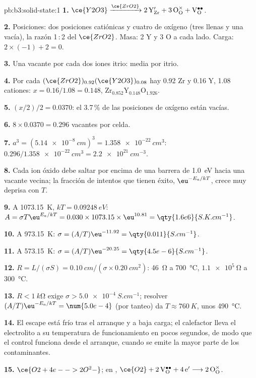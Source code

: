 \begin{solution}{pb:b3:solid-state:1}
\textbf{1.} $\ce{Y2O3} \xrightarrow{\ce{ZrO2}} \mathrm{2\,Y_{Zr}' + 3\,O_O^{\times} + V_O^{\bullet\bullet}}$.

\textbf{2.} Posiciones: dos posiciones catiónicas y cuatro de oxígeno (tres llenas y una vacía),
la razón 1\,:\,2 del $\ce{ZrO2}$. Masa: 2 Y y 3 O a cada lado. Carga: $2 \times (-1) + 2 = 0$.

\textbf{3.} Una vacante por cada dos iones itrio: media por itrio.

\textbf{4.} Por cada $(\ce{ZrO2})_{0.92}(\ce{Y2O3})_{0.08}$ hay 0.92 Zr y 0.16 Y, 1.08 cationes: $x = 0.16/1.08 = 0.148$,
$\mathrm{Zr_{0.852}Y_{0.148}O_{1.926}}$.

\textbf{5.} $(x/2)/2 = 0.0370$: el 3.7\,\% de las posiciones de oxígeno están vacías.

\textbf{6.} $8 \times 0.0370 = 0.296$ vacantes por celda.

\textbf{7.} $a^3 = (\qty{5.14e-8}{cm})^3 = \qty{1.358e-22}{cm^3}$: $0.296/\qty{1.358e-22}{cm^3} = \qty{2.2e21}{cm^{-3}}$.

\textbf{8.} Cada ion óxido debe saltar por encima de una barrera de \qty{1.0}{eV} hacia una vacante
vecina; la fracción de intentos que tienen éxito, $\eu^{-E_a/kT}$, crece muy deprisa con $T$.

\textbf{9.} A \qty{1073.15}{K}, $kT = \qty{0.09248}{eV}$: $A = \sigma T\eu^{E_a/kT} = 0.030 \times 1073.15 \times \eu^{10.81} = \qty{1.6e6}{S.K.cm^{-1}}$.

\textbf{10.} A \qty{973.15}{K}: $\sigma = (A/T)\eu^{-11.92} = \qty{0.011}{S.cm^{-1}}$.

\textbf{11.} A \qty{573.15}{K}: $\sigma = (A/T)\eu^{-20.25} = \qty{4.5e-6}{S.cm^{-1}}$.

\textbf{12.} $R = L/(\sigma S) = \qty{0.10}{cm}/(\sigma \times \qty{0.20}{cm^2})$: \qty{46}{\ohm} a \qty{700}{\celsius}, $\qty{1.1e5}{\ohm}$ a \qty{300}{\celsius}.

\textbf{13.} $R < \qty{1}{k\ohm}$ exige $\sigma > \qty{5.0e-4}{S.cm^{-1}}$; resolver $(A/T)\eu^{-E_a/kT} = \num{5.0e-4}$ (por tanteo)
da $T \approx \qty{760}{K}$, unos \qty{490}{\celsius}.

\textbf{14.} El escape está frío tras el arranque y a baja carga; el calefactor lleva el
electrolito a su temperatura de funcionamiento en pocos segundos, de modo que el control
funciona desde el arranque, cuando se emite la mayor parte de los contaminantes.

\textbf{15.} $\ce{O2 + 4e- -> 2O^2-}$; en , $\ce{O2} + \mathrm{2\,V_O^{\bullet\bullet} + 4\,e'} \longrightarrow \mathrm{2\,O_O^{\times}}$.


\end{solution}
